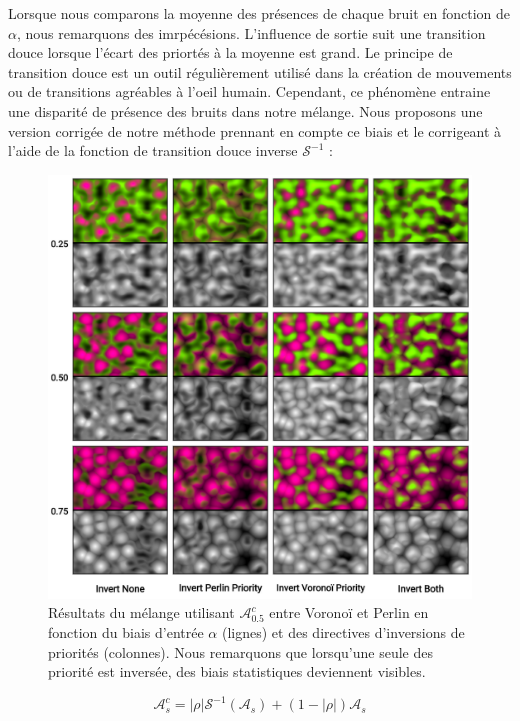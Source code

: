 \documentclass[9pt, twocolumn]{article} %
\begin{document}
Lorsque nous comparons la moyenne des présences de chaque bruit en fonction de
$\alpha$, nous remarquons des imrpécésions. L'influence de sortie suit une
transition douce lorsque l'écart des priortés à la moyenne est grand. Le
principe de transition douce est un outil régulièrement utilisé dans la
création de mouvements ou de transitions agréables à l'oeil humain. Cependant,
ce phénomène entraine une disparité de présence des bruits dans notre mélange.
Nous proposons une version corrigée de notre méthode prennant en compte ce
biais et le corrigeant à l'aide de la fonction de transition douce inverse
$\mathcal{S}^{-1}$ :

\begin{figure}
  \includegraphics[width=\linewidth]{figures/MixMax_Invert.png}
  \caption{
  Résultats du mélange utilisant $\mathcal{A}^c_{0.5}$ entre Voronoï et Perlin en fonction du biais d'entrée $\alpha$ (lignes) et des directives d'inversions de priorités (colonnes). Nous remarquons que lorsqu'une seule des priorité est inversée, des biais statistiques deviennent visibles.
  }
  \label{fig::MixMax_Invert}
\end{figure}

\begin{equation}\label{A_corrected}
  \mathcal{A}_s^c =
  |\rho| \mathcal{S}^{-1}(\mathcal{A}_s)
  +
  (1-|\rho|)\mathcal{A}_s
\end{equation}
\end{document}
